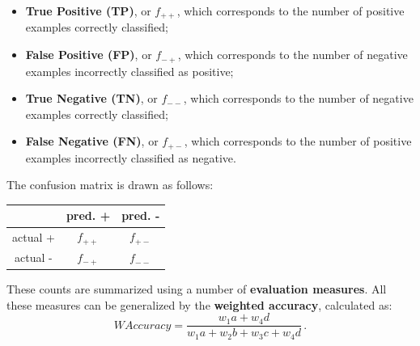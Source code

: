 \begin{itemize}
    \item \textbf{True Positive (TP)}, or $f_{++}$, which corresponds to the number of positive examples correctly classified;

    \item \textbf{False Positive (FP)}, or $f_{-+}$, which corresponds to the number of negative examples incorrectly classified as positive;

    \item \textbf{True Negative (TN)}, or $f_{--}$, which corresponds to the number of negative examples correctly classified;

    \item \textbf{False Negative (FN)}, or $f_{+-}$, which corresponds to the number of positive examples incorrectly classified as negative.
\end{itemize}

The confusion matrix is drawn as follows:

\begin{table}[ht]
    \centering
    \begin{tabular}{|c|c|c|}
         \hline
         & pred. + & pred. - \\
        \hline
        actual + & $f_{++}$ & $f_{+-}$\\
        \hline
        actual - & $f_{-+}$ & $f_{--}$\\
        \hline
    \end{tabular}
\end{table}

These counts are summarized using a number of \textbf{evaluation measures}.
All these measures can be generalized by the \textbf{weighted accuracy}, calculated as:
\begin{equation*}
    \textit{WAccuracy} = \dfrac{w_1a + w_4d}{w_1a + w_2b + w_3c + w_4d} \, .
\end{equation*}

